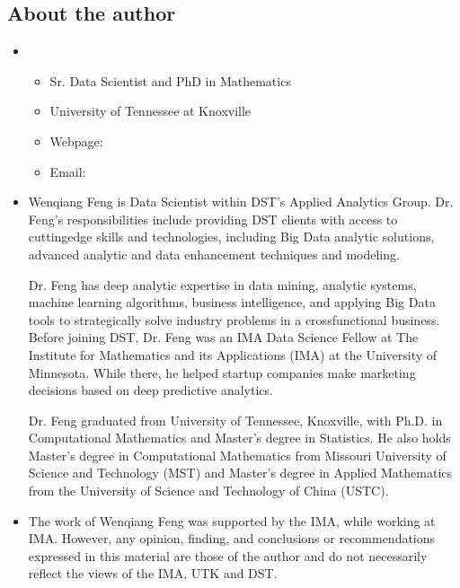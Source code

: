 \documentclass[letterpaper,11pt,english]{sphinxmanual}
\begin{document}
\subsection{About the author}
\label{\detokenize{preface:about-the-author}}\begin{itemize}
\item {} 
\sphinxAtStartPar
{}
\begin{itemize}
\item {} 
\sphinxAtStartPar
Sr. Data Scientist and PhD in Mathematics

\item {} 
\sphinxAtStartPar
University of Tennessee at Knoxville

\item {} 
\sphinxAtStartPar
Webpage: 

\item {} 
\sphinxAtStartPar
Email: 

\end{itemize}

\item {} 
\sphinxAtStartPar
{}

\sphinxAtStartPar
Wenqiang Feng is Data Scientist within DST’s Applied Analytics Group. Dr. Feng’s responsibilities include providing
DST clients with access to cutting\sphinxhyphen{}edge skills and technologies, including Big Data analytic solutions, advanced
analytic and data enhancement techniques and modeling.

\sphinxAtStartPar
Dr. Feng has deep analytic expertise in data mining, analytic systems, machine learning algorithms, business
intelligence, and applying Big Data tools to strategically solve industry problems in a cross\sphinxhyphen{}functional business.
Before joining DST, Dr. Feng was an IMA Data Science Fellow at The Institute for Mathematics and its
Applications (IMA) at the University of Minnesota. While there, he helped startup companies make marketing
decisions based on deep predictive analytics.

\sphinxAtStartPar
Dr. Feng graduated from University of Tennessee, Knoxville, with Ph.D. in Computational Mathematics and Master’s
degree in Statistics. He also holds Master’s degree in Computational Mathematics from Missouri University of
Science and Technology (MST) and Master’s degree in Applied Mathematics from the University of Science and
Technology of China (USTC).

\item {} 
\sphinxAtStartPar
{}

\sphinxAtStartPar
The work of Wenqiang Feng was supported by the IMA, while working at IMA. However, any opinion, finding,
and conclusions or recommendations expressed in this material are those of the author and do not necessarily
reflect the views of the IMA, UTK and DST.

\end{itemize}
\end{document}
